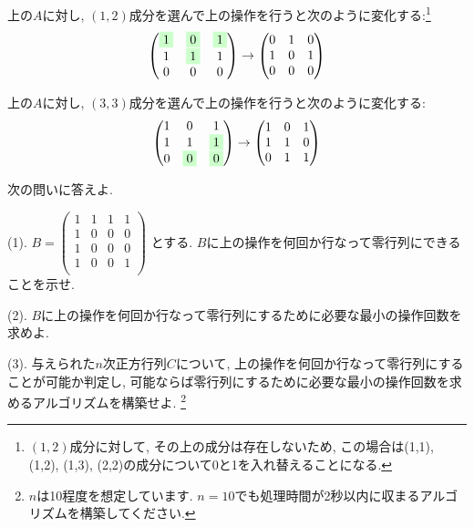 \documentclass[dvipdfmx,a4paper,11pt]{article}
\theoremstyle{definition}
\begin{document}
上の$A$に対し, $(1,2)$成分を選んで上の操作を行うと次のように変化する:\footnote{$(1,2)$成分に対して, その上の成分は存在しないため, この場合は(1,1), (1,2), (1,3), (2,2)の成分について0と1を入れ替えることになる.}
 $$
  \begin{pmatrix}
\colorbox[rgb]{0.8, 1.0, 0.8}{1} & \colorbox[rgb]{0.8, 1.0, 0.8}{0} & \colorbox[rgb]{0.8, 1.0, 0.8}{1}\\
1 & \colorbox[rgb]{0.8, 1.0, 0.8}{1} & 1\\
0 & 0 & 0 \\
 \end{pmatrix}
 \rightarrow 
  \begin{pmatrix}
0 & 1 & 0\\
1 & 0 & 1\\
0 & 0 & 0 \\
 \end{pmatrix}
 $$

上の$A$に対し, $(3,3)$成分を選んで上の操作を行うと次のように変化する:
 $$
  \begin{pmatrix}
1 & 0 & 1\\
1 & 1 & \colorbox[rgb]{0.8, 1.0, 0.8}{1}\\
0 & \colorbox[rgb]{0.8, 1.0, 0.8}{0} & \colorbox[rgb]{0.8, 1.0, 0.8}{0} \\
 \end{pmatrix}
 \rightarrow 
  \begin{pmatrix}
1 & 0 & 1\\
1 & 1 & 0\\
0 & 1 & 1 \\
 \end{pmatrix}
 $$

次の問いに答えよ.
\vspace{11pt}

(1). 
$
B = 
  \begin{pmatrix}
1 & 1 & 1 & 1\\
1 & 0 & 0 & 0 \\
1 & 0 & 0 & 0 \\
1 & 0 & 0 & 1 \\
 \end{pmatrix}
 $
とする. $B$に上の操作を何回か行なって零行列にできることを示せ.

(2). $B$に上の操作を何回か行なって零行列にするために必要な最小の操作回数を求めよ.

(3). 与えられた$n$次正方行列$C$について, 上の操作を何回か行なって零行列にすることが可能か判定し, 可能ならば零行列にするために必要な最小の操作回数を求めるアルゴリズムを構築せよ.  \footnote{$n$は10程度を想定しています. $n=10$でも処理時間が2秒以内に収まるアルゴリズムを構築してください.}
\end{document}
